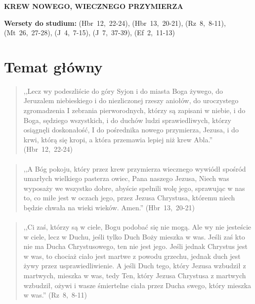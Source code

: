 \documentclass[10pt,a4paper,oneside]{article}
\begin{document}
\centerline{\textbf{\MakeUppercase{Krew nowego, wiecznego przymierza}}}
\begin{center}
\textbf{Wersety do studium:} 
\mbox{(Hbr 12, 22-24)}, \mbox{(Hbr 13, 20-21)}, \mbox{(Rz 8, 8-11)}, \mbox{(Mt 26, 27-28)}, \mbox{(J 4, 7-15)}, \mbox{(J 7, 37-39)}, \mbox{(Ef 2, 11-13)}
\end{center}
\section{Temat główny}
\paragraph{}
\begin{quote}
,,Lecz wy podeszliście do góry Syjon i do miasta Boga żywego, do Jeruzalem niebieskiego i do niezliczonej rzeszy aniołów, do uroczystego zgromadzenia I zebrania pierworodnych, którzy są zapisani w niebie, i do Boga, sędziego wszystkich, i do duchów ludzi sprawiedliwych, którzy osiągnęli doskonałość, I do pośrednika nowego przymierza, Jezusa, i do krwi, którą się kropi, a która przemawia lepiej niż krew Abla.'' \mbox{(Hbr 12, 22-24)}
\end{quote}
\paragraph{}
\begin{quote}
,,A Bóg pokoju, który przez krew przymierza wiecznego wywiódł spośród umarłych wielkiego pasterza owiec, Pana naszego Jezusa, Niech was wyposaży we wszystko dobre, abyście spełnili wolę jego, sprawując w nas to, co miłe jest w oczach jego, przez Jezusa Chrystusa, któremu niech będzie chwała na wieki wieków. Amen.'' \mbox{(Hbr 13, 20-21)}
\end{quote}
\paragraph{}
\begin{quote}
,,Ci zaś, którzy są w ciele, Bogu podobać się nie mogą. Ale wy nie jesteście w ciele, lecz w Duchu, jeśli tylko Duch Boży mieszka w was. Jeśli zaś kto nie ma Ducha Chrystusowego, ten nie jest jego. Jeśli jednak Chrystus jest w was, to chociaż ciało jest martwe z powodu grzechu, jednak duch jest żywy przez usprawiedliwienie. A jeśli Duch tego, który Jezusa wzbudził z martwych, mieszka w was, tedy Ten, który Jezusa Chrystusa z martwych wzbudził, ożywi i wasze śmiertelne ciała przez Ducha swego, który mieszka w was.'' \mbox{(Rz 8, 8-11)}
\end{quote}
\end{document}
